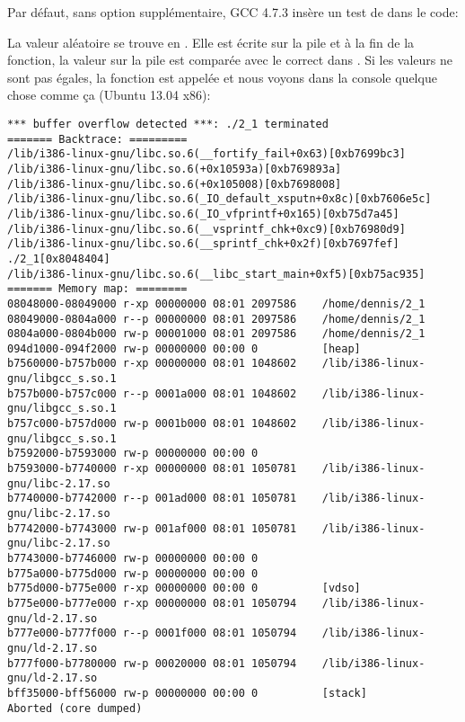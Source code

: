 Par défaut, sans option supplémentaire, GCC 4.7.3 insère un test de   dans
le code:



La valeur aléatoire se trouve en .
Elle est écrite sur la pile et à la fin de la fonction, la valeur sur la pile est
comparée avec le  correct dans .
Si les valeurs ne sont pas égales, la fonction  est appelée
et nous voyons dans la console quelque chose comme ça (Ubuntu 13.04 x86):

\begin{lstlisting}
*** buffer overflow detected ***: ./2_1 terminated
======= Backtrace: =========
/lib/i386-linux-gnu/libc.so.6(__fortify_fail+0x63)[0xb7699bc3]
/lib/i386-linux-gnu/libc.so.6(+0x10593a)[0xb769893a]
/lib/i386-linux-gnu/libc.so.6(+0x105008)[0xb7698008]
/lib/i386-linux-gnu/libc.so.6(_IO_default_xsputn+0x8c)[0xb7606e5c]
/lib/i386-linux-gnu/libc.so.6(_IO_vfprintf+0x165)[0xb75d7a45]
/lib/i386-linux-gnu/libc.so.6(__vsprintf_chk+0xc9)[0xb76980d9]
/lib/i386-linux-gnu/libc.so.6(__sprintf_chk+0x2f)[0xb7697fef]
./2_1[0x8048404]
/lib/i386-linux-gnu/libc.so.6(__libc_start_main+0xf5)[0xb75ac935]
======= Memory map: ========
08048000-08049000 r-xp 00000000 08:01 2097586    /home/dennis/2_1
08049000-0804a000 r--p 00000000 08:01 2097586    /home/dennis/2_1
0804a000-0804b000 rw-p 00001000 08:01 2097586    /home/dennis/2_1
094d1000-094f2000 rw-p 00000000 00:00 0          [heap]
b7560000-b757b000 r-xp 00000000 08:01 1048602    /lib/i386-linux-gnu/libgcc_s.so.1
b757b000-b757c000 r--p 0001a000 08:01 1048602    /lib/i386-linux-gnu/libgcc_s.so.1
b757c000-b757d000 rw-p 0001b000 08:01 1048602    /lib/i386-linux-gnu/libgcc_s.so.1
b7592000-b7593000 rw-p 00000000 00:00 0
b7593000-b7740000 r-xp 00000000 08:01 1050781    /lib/i386-linux-gnu/libc-2.17.so
b7740000-b7742000 r--p 001ad000 08:01 1050781    /lib/i386-linux-gnu/libc-2.17.so
b7742000-b7743000 rw-p 001af000 08:01 1050781    /lib/i386-linux-gnu/libc-2.17.so
b7743000-b7746000 rw-p 00000000 00:00 0
b775a000-b775d000 rw-p 00000000 00:00 0
b775d000-b775e000 r-xp 00000000 00:00 0          [vdso]
b775e000-b777e000 r-xp 00000000 08:01 1050794    /lib/i386-linux-gnu/ld-2.17.so
b777e000-b777f000 r--p 0001f000 08:01 1050794    /lib/i386-linux-gnu/ld-2.17.so
b777f000-b7780000 rw-p 00020000 08:01 1050794    /lib/i386-linux-gnu/ld-2.17.so
bff35000-bff56000 rw-p 00000000 00:00 0          [stack]
Aborted (core dumped)
\end{lstlisting}

